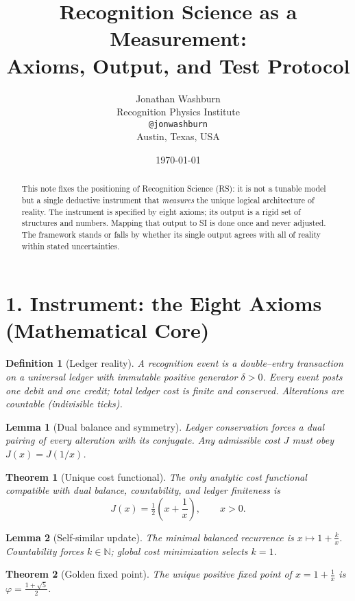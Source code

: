 \documentclass[11pt]{article}
\title{\bf Recognition Science as a Measurement:\\
Axioms, Output, and Test Protocol}
\author{Jonathan Washburn\\
Recognition Physics Institute\\
\texttt{@jonwashburn}\\
Austin, Texas, USA}
\date{\today}
\newtheorem{definition}{Definition}
\newtheorem{lemma}{Lemma}
\newtheorem{theorem}{Theorem}
\begin{document}
\maketitle

\begin{abstract}
This note fixes the positioning of Recognition Science (RS): it is not a tunable model but a single deductive instrument that \emph{measures} the unique logical architecture of reality. The instrument is specified by eight axioms; its output is a rigid set of structures and numbers. Mapping that output to SI is done once and never adjusted. The framework stands or falls by whether its single output agrees with all of reality within stated uncertainties.
\end{abstract}

\section*{1. Instrument: the Eight Axioms (Mathematical Core)}
\begin{definition}[Ledger reality]
A recognition event is a double--entry transaction on a universal ledger with immutable positive generator $\delta>0$. Every event posts one debit and one credit; total ledger cost is finite and conserved. Alterations are countable (indivisible ticks).
\end{definition}

\begin{lemma}[Dual balance and symmetry]
Ledger conservation forces a dual pairing of every alteration with its conjugate. Any admissible cost $J$ must obey $J(x)=J(1/x)$.
\end{lemma}

\begin{theorem}[Unique cost functional]
The only analytic cost functional compatible with dual balance, countability, and ledger finiteness is
\[
J(x)=\tfrac12\!\left(x+\frac{1}{x}\right),\qquad x>0.
\]
\end{theorem}

\begin{lemma}[Self-similar update]
The minimal balanced recurrence is $x\mapsto 1+\tfrac{k}{x}$. Countability forces $k\in\mathbb{N}$; global cost minimization selects $k=1$.
\end{lemma}

\begin{theorem}[Golden fixed point]
The unique positive fixed point of $x=1+\tfrac{1}{x}$ is $\varphi=\tfrac{1+\sqrt{5}}{2}$.
\end{theorem}
\end{document}
